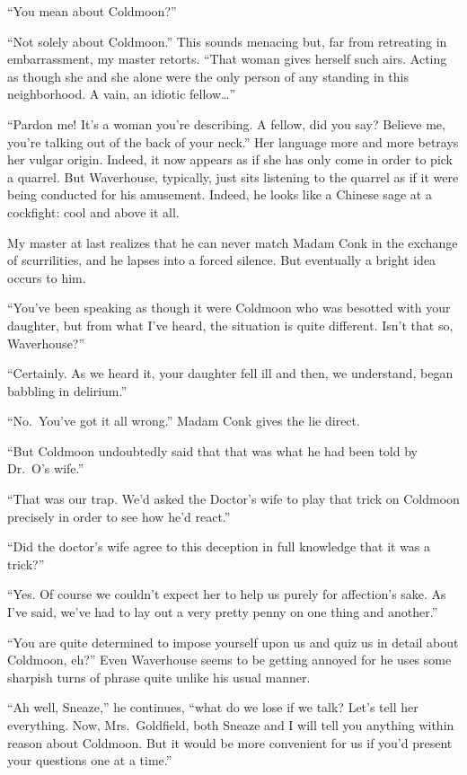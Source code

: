 \documentclass[12pt, openright]{book}
\begin{document}
``You mean about Coldmoon?''

``Not solely about Coldmoon.'' This sounds menacing but, far from
retreating in embarrassment, my master retorts. ``That woman gives
herself such airs. Acting as though she and she alone were the only
person of any standing in this neighborhood. A vain, an idiotic
fellow\ldots{}''

``Pardon me! It's a woman you're describing. A fellow, did you say?
Believe me, you're talking out of the back of your neck.'' Her language
more and more betrays her vulgar origin. Indeed, it now appears as if
she has only come in order to pick a quarrel. But Waverhouse, typically,
just sits listening to the quarrel as if it were being conducted for his
amusement. Indeed, he looks like a Chinese sage at a cockfight: cool and
above it all.

My master at last realizes that he can never match Madam Conk in the
exchange of scurrilities, and he lapses into a forced silence. But
eventually a bright idea occurs to him.

``You've been speaking as though it were Coldmoon who was besotted with
your daughter, but from what I've heard, the situation is quite
different. Isn't that so, Waverhouse?''

``Certainly. As we heard it, your daughter fell ill and then, we
understand, began babbling in delirium.''

``No.~You've got it all wrong.'' Madam Conk gives the lie direct.

``But Coldmoon undoubtedly said that that was what he had been told by
Dr.~O's wife.''

``That was our trap. We'd asked the Doctor's wife to play that trick on
Coldmoon precisely in order to see how he'd react.''

``Did the doctor's wife agree to this deception in full knowledge that
it was a trick?''

``Yes. Of course we couldn't expect her to help us purely for
affection's sake. As I've said, we've had to lay out a very pretty penny
on one thing and another.''

``You are quite determined to impose yourself upon us and quiz us in
detail about Coldmoon, eh?'' Even Waverhouse seems to be getting annoyed
for he uses some sharpish turns of phrase quite unlike his usual manner.

``Ah well, Sneaze,'' he continues, ``what do we lose if we talk? Let's
tell her everything. Now, Mrs.~Goldfield, both Sneaze and I will tell
you anything within reason about Coldmoon. But it would be more
convenient for us if you'd present your questions one at a time.''
\end{document}

